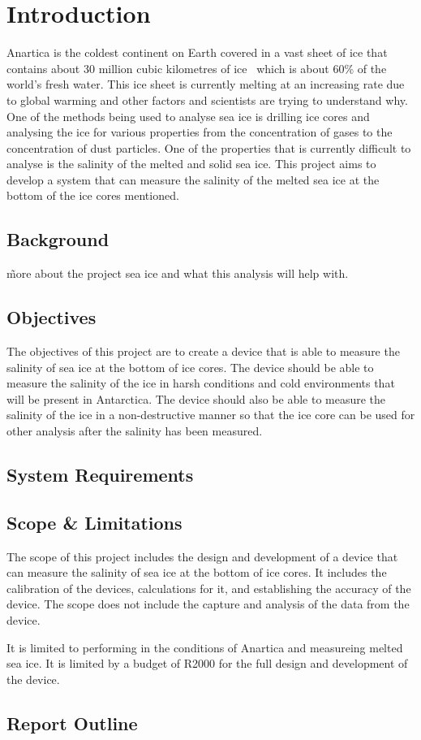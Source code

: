 
\chapter{Introduction}

Anartica is the coldest continent on Earth covered in a vast sheet of ice that contains about 30 million cubic kilometres of ice~\cite{NSIDC_ice_sheet_facts_2024} which is about 60\% of the world's fresh water.
This ice sheet is currently melting at an increasing rate due to global warming and other factors and scientists are trying to understand why.
One of the methods being used to analyse sea ice is drilling ice cores and analysing the ice for various properties from the concentration of gases to the concentration of dust particles.
One of the properties that is currently difficult to analyse is the salinity of the melted and solid sea ice.
This project aims to develop a system that can measure the salinity of the melted sea ice at the bottom of the ice cores mentioned. 

\section{Background}
\~ more about the project sea ice and what this analysis will help with.

\section{Objectives}
The objectives of this project are to create a device that is able to measure the salinity of sea ice at the bottom of ice cores.
The device should be able to measure the salinity of the ice in harsh conditions and cold environments that will be present in Antarctica.
The device should also be able to measure the salinity of the ice in a non-destructive manner so that the ice core can be used for other analysis after the salinity has been measured.

\section{System Requirements}
\lipsum[1]

\section{Scope \& Limitations}
The scope of this project includes the design and development of a device that can measure the salinity of sea ice at the bottom of ice cores.
It includes the calibration of the devices, calculations for it, and establishing the accuracy of the device.
The scope does not include the capture and analysis of the data from the device.

It is limited to performing in the conditions of Anartica and measureing melted sea ice.
It is limited by a budget of R2000 for the full design and development of the device.

\section{Report Outline}
\lipsum[1]
